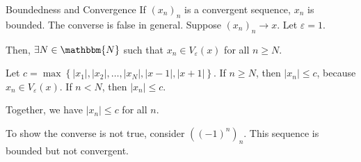 \documentclass[10pt]{extarticle}
\newcommand{\N}{\mathbbm{N}}
\begin{document}
  \begin{problem}{Boundedness and Convergence}
    If $\left(x_n\right)_n$ is a convergent sequence, $x_n$ is bounded. The converse is false in general.
    \tcblower
    Suppose $\left(x_n\right)_n \rightarrow x$. Let $\varepsilon = 1$.\newline

    Then, $\exists N\in\N$ such that $x_n\in V_{\varepsilon}(x)$ for all $n\geq N$.\newline

    Let $c = \max\left\{|x_1|,|x_2|,\dots,|x_N|,|x-1|,|x+1|\right\}$. If $n\geq N$, then $|x_n| \leq c$, because $x_n \in V_{\varepsilon}(x)$. If $n < N$, then $|x_n| \leq c$.\newline

    Together, we have $|x_n| \leq c$ for all $n$.\newline

    To show the converse is not true, consider $\left((-1)^n\right)_n$. This sequence is bounded but not convergent.
  \end{problem}
\end{document}
